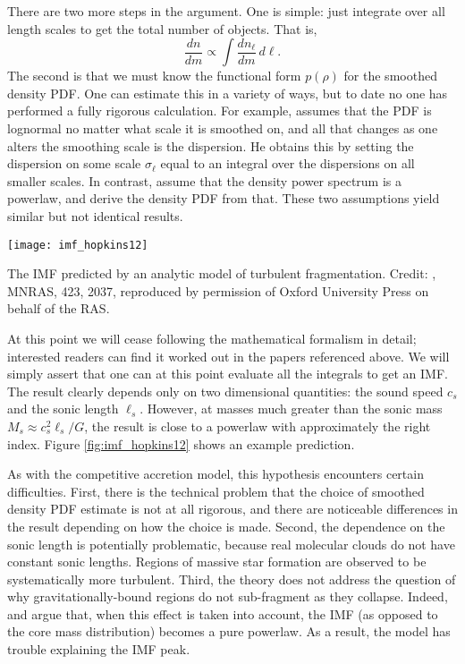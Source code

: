 There are two more steps in the argument. One is simple: just integrate over all length scales to get the total number of objects. That is,
\begin{equation}
\frac{dn}{dm} \propto \int \frac{dn_\ell}{dm} \, d\ell.
\end{equation}
The second is that we must know the functional form $p(\rho)$ for the smoothed density PDF. One can estimate this in a variety of ways, but to date no one has performed a fully rigorous calculation. For example, \citet{hopkins12e} assumes that the PDF is lognormal no matter what scale it is smoothed on, and all that changes as one alters the smoothing scale is the dispersion. He obtains this by setting the dispersion on some scale $\sigma_\ell$ equal to an integral over the dispersions on all smaller scales. In contrast, \citet{hennebelle08b, hennebelle09a} assume that the density power spectrum is a powerlaw, and derive the density PDF from that. These two assumptions yield similar but not identical results.

\begin{marginfigure}
\texttt{[image: imf\_hopkins12]}
\caption[IMF from an analytic model of turbulent fragmentation]{
\label{fig:imf_hopkins12}
The IMF predicted by an analytic model of turbulent fragmentation. Credit: \citeauthor{hopkins12d}, MNRAS, 423, 2037, reproduced by permission of Oxford University Press on behalf of the RAS.
}
\end{marginfigure}
At this point we will cease following the mathematical formalism in detail; interested readers can find it worked out in the papers referenced above. We will simply assert that one can at this point evaluate all the integrals to get an IMF. The result clearly depends only on two dimensional quantities: the sound speed $c_s$ and the sonic length $\ell_s$. However, at masses much greater than the sonic mass $M_s \approx c_s^2 \ell_s/G$, the result is close to a powerlaw with approximately the right index. Figure \ref{fig:imf_hopkins12} shows an example prediction.

As with the competitive accretion model, this hypothesis encounters certain difficulties. First, there is the technical problem that the choice of smoothed density PDF estimate is not at all rigorous, and there are noticeable differences in the result depending on how the choice is made. Second, the dependence on the sonic length is potentially problematic, because real molecular clouds do not have constant sonic lengths. Regions of massive star formation are observed to be systematically more turbulent. Third, the theory does not address the question of why gravitationally-bound regions do not sub-fragment as they collapse. Indeed, \citet{guszejnov15a} and \citet{guszejnov16a} argue that, when this effect is taken into account, the IMF (as opposed to the core mass distribution) becomes a pure powerlaw. As a result, the model has trouble explaining the IMF peak.

